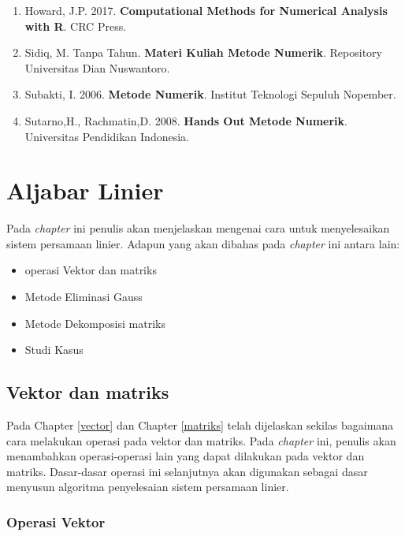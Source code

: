 \documentclass[
]{book}
\providecommand{\tightlist}{%
  \setlength{\itemsep}{0pt}\setlength{\parskip}{0pt}}
\theoremstyle{definition}
\theoremstyle{definition}
\theoremstyle{definition}
\theoremstyle{definition}
\theoremstyle{remark}
\begin{document}
\begin{enumerate}
\def\labelenumi{\arabic{enumi}.}
\tightlist
\item
  Howard, J.P. 2017. \textbf{Computational Methods for Numerical Analysis with R}. CRC Press.
\item
  Sidiq, M. Tanpa Tahun. \textbf{Materi Kuliah Metode Numerik}. Repository Universitas Dian Nuswantoro.
\item
  Subakti, I. 2006. \textbf{Metode Numerik}. Institut Teknologi Sepuluh Nopember.
\item
  Sutarno,H., Rachmatin,D. 2008. \textbf{Hands Out Metode Numerik}. Universitas Pendidikan Indonesia.
\end{enumerate}

\hypertarget{linearaljabar}{%
\chapter{Aljabar Linier}\label{linearaljabar}}

Pada \emph{chapter} ini penulis akan menjelaskan mengenai cara untuk menyelesaikan sistem persamaan linier. Adapun yang akan dibahas pada \emph{chapter} ini antara lain:

\begin{itemize}
\tightlist
\item
  operasi Vektor dan matriks
\item
  Metode Eliminasi Gauss
\item
  Metode Dekomposisi matriks
\item
  Studi Kasus
\end{itemize}

\hypertarget{vecmat}{%
\section{Vektor dan matriks}\label{vecmat}}

Pada Chapter \ref{vector} dan Chapter \ref{matriks} telah dijelaskan sekilas bagaimana cara melakukan operasi pada vektor dan matriks. Pada \emph{chapter} ini, penulis akan menambahkan operasi-operasi lain yang dapat dilakukan pada vektor dan matriks. Dasar-dasar operasi ini selanjutnya akan digunakan sebagai dasar menyusun algoritma penyelesaian sistem persamaan linier.

\hypertarget{operasivektor}{%
\subsection{Operasi Vektor}\label{operasivektor}}
\end{document}
